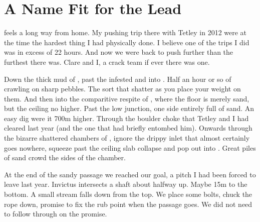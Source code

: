 \begin{marginfigure}
\end{marginfigure}

\section{A Name Fit for the Lead}


 feels a long way from home. My pushing trip there with Tetley in 2012 were at the time the hardest thing I had physically done. I believe one of the trips I did was in excess of 22 hours. And now we were back to push further than the furthest there was. Clare and I, a crack team if ever there was one. 

Down the thick mud of , past the infested  and into . Half an hour or so of crawling on sharp pebbles. The sort that shatter as you place your weight on them. And then into the comparitive respite of , where the floor is merely sand, but the ceiling no higher. Past the low junction, one side entirely full of sand. An easy dig were it 700m higher. Through the boulder choke that Tetley and I had cleared last year (and the one that had briefly entombed him). Onwards through the bizarre shattered chambers of , ignore the drippy inlet that almost certainly goes nowhere, squeeze past the ceiling slab collapse and pop out into . Great piles of sand crowd the sides of the chamber.

At the end of the sandy passage we reached our goal, a pitch I had been forced to leave last year. Invictus intersects a shaft about halfway up. Maybe 15m to the bottom. A small stream falls down from the top. We place some bolts, chuck the rope down, promise to fix the rub point when the passage goes. We did not need to follow through on the promise. 

